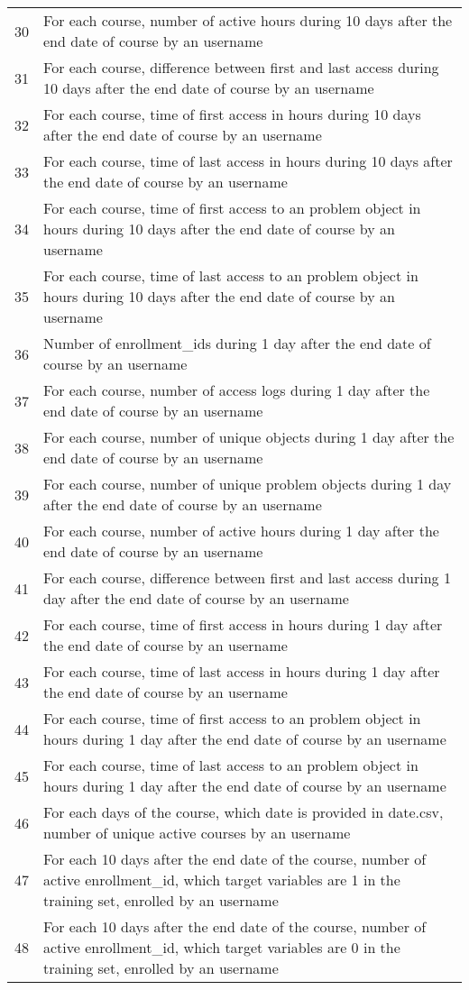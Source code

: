 \begin{center}
\begin{table*}[ht]
\begin{minipage}{\textwidth}
{\begin{tabular}{|l|l|}
      30 & For each course, number of active hours during 10 days after the end date of course by an username \tabularnewline
      31 & For each course, difference between first and last access during 10 days after the end date of course by an username \tabularnewline
      32 & For each course, time of first access in hours during 10 days after the end date of course by an username \tabularnewline
      33 & For each course, time of last access in hours during 10 days after the end date of course by an username \tabularnewline
      34 & For each course, time of first access to an problem object in hours during 10 days after the end date of course by an username \tabularnewline
      35 & For each course, time of last access to an problem object in hours during 10 days after the end date of course by an username \tabularnewline
      36 & Number of enrollment\_ids during 1 day after the end date of course by an username \tabularnewline
      37 & For each course, number of access logs during 1 day after the end date of course by an username \tabularnewline
      38 & For each course, number of unique objects during 1 day after the end date of course by an username \tabularnewline
      39 & For each course, number of unique problem objects during 1 day after the end date of course by an username \tabularnewline
      40 & For each course, number of active hours during 1 day after the end date of course by an username \tabularnewline
      41 & For each course, difference between first and last access during 1 day after the end date of course by an username \tabularnewline
      42 & For each course, time of first access in hours during 1 day after the end date of course by an username \tabularnewline
      43 & For each course, time of last access in hours during 1 day after the end date of course by an username \tabularnewline
      44 & For each course, time of first access to an problem object in hours during 1 day after the end date of course by an username \tabularnewline
      45 & For each course, time of last access to an problem object in hours during 1 day after the end date of course by an username \tabularnewline
      46 & For each days of the course, which date is provided in date.csv, number of unique active courses by an username \tabularnewline
      47 & For each 10 days after the end date of the course, number of active enrollment\_id, which target variables are 1 in the training set, enrolled by an username \tabularnewline 
      48 & For each 10 days after the end date of the course, number of active enrollment\_id, which target variables are 0 in the training set, enrolled by an username \tabularnewline 

\end{tabular}}
\end{minipage}
\end{table*}
\end{center}

